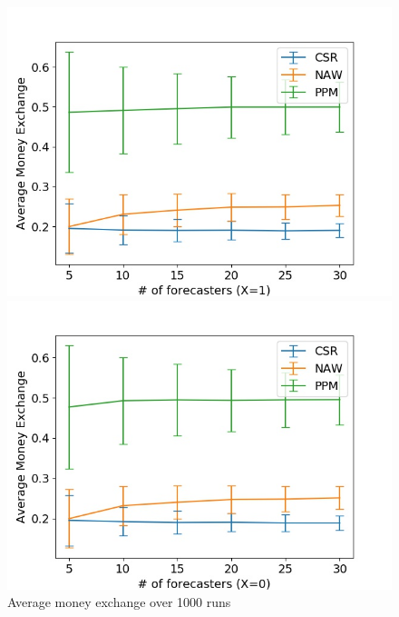 \documentclass[english,10pt]{article}
\begin{document}
\begin{enumerate}
        	\begin{figure}[H]
        	\centering
        	\begin{minipage}{0.48\textwidth}
        \includegraphics[width = \textwidth]{MnEx(Beta(0dot3_0dot3)F_UnifW)Avg_MnEx(X=1).jpg}
        	\end{minipage}
        	\begin{minipage}{0.48\textwidth}
        \includegraphics[width = \textwidth]{MnEx(Beta(0dot3_0dot3)F_UnifW)Avg_MnEx(X=0).jpg}
        	\end{minipage}
        	\caption{Average money exchange over 1000 runs}
        	\end{figure}
        	

\end{enumerate}
\end{document}
